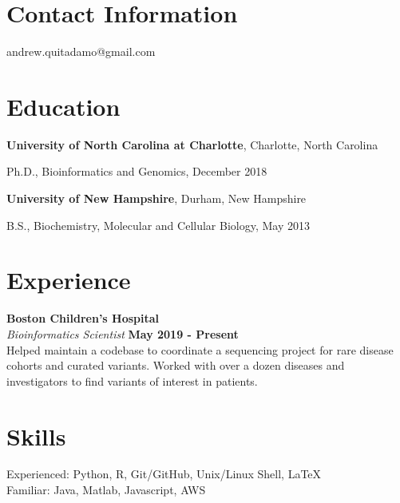 \documentclass[margin,line]{res}
\newenvironment{list1}{
  \begin{list}{\ding{113}}{%
      \setlength{\itemsep}{0in}
      \setlength{\parsep}{0in} \setlength{\parskip}{0in}
      \setlength{\topsep}{0in} \setlength{\partopsep}{0in} 
      \setlength{\leftmargin}{0.17in}}}{\end{list}}
\begin{document}

\begin{resume}
\section{\sc Contact Information}
\vspace{.05in}
andrew.quitadamo@gmail.com \\

\section{\sc Education}
{\bf University of North Carolina at Charlotte}, Charlotte, North Carolina\\

\vspace*{-.1in}
\begin{list1}
\item[] Ph.D., Bioinformatics and Genomics, December 2018

\end{list1}

{\bf University of New Hampshire}, Durham, New Hampshire\\ 
\vspace*{-.1in}
\begin{list1}
\item[] B.S., Biochemistry, Molecular and Cellular Biology,  May 2013
\end{list1}

\section{\sc Experience}
{\bf Boston Children's Hospital}\\
{\em Bioinformatics Scientist} \hfill {\bf May 2019 - Present}\\
Helped maintain a codebase to coordinate a sequencing project for rare disease cohorts and curated variants. Worked with over a dozen diseases and investigators to find variants of interest in patients. 


\section{\sc Skills}
Experienced: Python, R, Git/GitHub, Unix/Linux Shell, \LaTeX\ \\
Familiar: Java, Matlab, Javascript, AWS



\end{resume}
\end{document}
